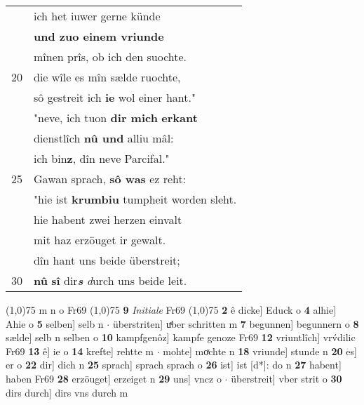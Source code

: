 \documentclass[8pt,a4paper,notitlepage]{article}
\begin{document}
\begin{table}[ht]
\begin{minipage}[t]{0.5\linewidth}
\begin{tabular}{rl}
 & ich het iuwer gerne künde\\ 
 & \textbf{und zuo einem vriunde}\\ 
 & mînen prîs, ob ich den suochte.\\ 
20 & die wîle es mîn sælde ruochte,\\ 
 & sô gestreit ich \textbf{ie} wol einer hant."\\ 
 & "neve, ich tuon \textbf{dir mich} \textbf{erkant}\\ 
 & dienstlîch \textbf{nû und} alliu mâl:\\ 
 & ich bin\textbf{z}, dîn neve Parcifal."\\ 
25 & Gawan sprach, \textbf{sô was} ez reht:\\ 
 & "hie ist \textbf{krumbiu} tumpheit worden sleht.\\ 
 & hie habent zwei herzen einvalt\\ 
 & mit haz erzöuget ir gewalt.\\ 
 & dîn hant uns beide überstreit;\\ 
30 & \textbf{nû} \textbf{sî} dir\textit{\textbf{s}} \textit{d}urch uns beide leit.\\ 
\end{tabular}
\scriptsize
\line(1,0){75} \newline
m n o Fr69 \newline
\line(1,0){75} \newline
\textbf{9} \textit{Initiale} Fr69  \newline
\line(1,0){75} \newline
\textbf{2} ê dicke] Educk o \textbf{4} alhie] Ahie o \textbf{5} selben] selb n  $\cdot$ überstriten] uͯber schritten m \textbf{7} begunnen] begunnern o \textbf{8} sælde] selb n selben o \textbf{10} kampfgenôz] kampfe genoze Fr69 \textbf{12} vriuntlîch] vrv́dilic Fr69 \textbf{13} ê] ie o \textbf{14} krefte] rehtte m  $\cdot$ mohte] moͯchte n \textbf{18} vriunde] stunde n \textbf{20} es] er o \textbf{22} dir] dich n \textbf{25} sprach] sprach sprach o \textbf{26} ist] ist [d*]: do n \textbf{27} habent] haben Fr69 \textbf{28} erzöuget] erzeiget n \textbf{29} uns] vncz o  $\cdot$ überstreit] vber strit o \textbf{30} dirs durch] dirs vns durch m \newline
\end{minipage}
\end{table}
\newpage
\end{document}
